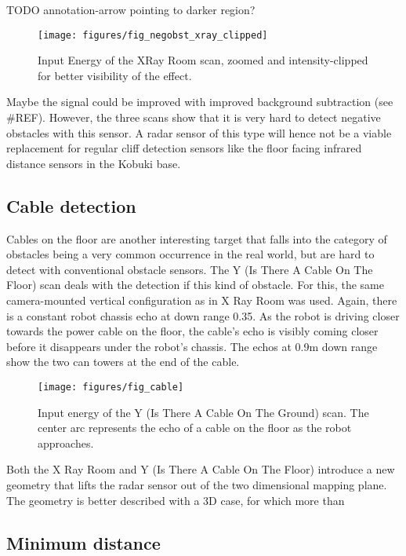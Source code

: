 TODO annotation-arrow pointing to darker region?

\begin{figure}[htp]
    \centering
    \label{fig:negobst_xray_clipped}
    \texttt{[image: figures/fig\_negobst\_xray\_clipped]}
    \caption{Input Energy of the XRay Room scan, zoomed and intensity-clipped for better visibility of the effect.}
\end{figure}

Maybe the signal could be improved with improved background subtraction
(see \#REF). However, the three scans show that it is very hard to
detect negative obstacles with this sensor. A radar sensor of this type
will hence not be a viable replacement for regular cliff detection
sensors like the floor facing infrared distance sensors in the Kobuki
base.

\subsection{Cable detection}\label{cable-detection}

Cables on the floor are another interesting target that falls into the
category of obstacles being a very common occurrence in the real world,
but are hard to detect with conventional obstacle sensors. The Y (Is
There A Cable On The Floor) scan deals with the detection if this kind
of obstacle. For this, the same camera-mounted vertical configuration as
in X Ray Room was used. Again, there is a constant robot chassis echo at
down range 0.35. As the robot is driving closer towards the power cable
on the floor, the cable's echo is visibly coming closer before it
disappears under the robot's chassis. The echos at 0.9m down range show
the two can towers at the end of the cable.

\begin{figure}[htp]
    \centering
    \label{fig:cable}
    \texttt{[image: figures/fig\_cable]}
    \caption{Input energy of the Y (Is There A Cable On The Ground) scan. The center arc represents the echo of a cable on the floor as the robot approaches.}
\end{figure}

Both the X Ray Room and Y (Is There A Cable On The Floor) introduce a
new geometry that lifts the radar sensor out of the two dimensional
mapping plane. The geometry is better described with a 3D case, for
which more than

\subsection{Minimum distance}\label{minimum-distance}

